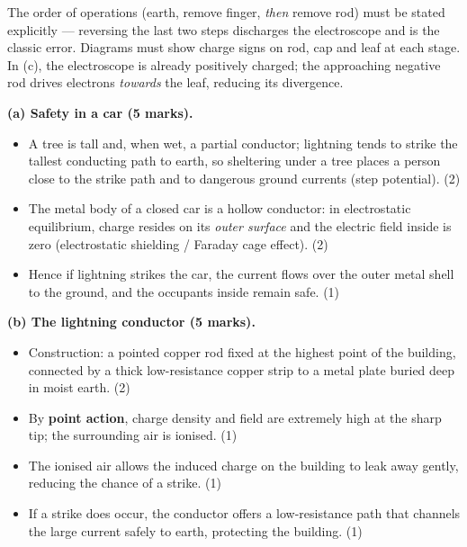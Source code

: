 \documentclass[11pt]{article}
\begin{document}
\begin{attention}
The order of operations (earth, remove finger, \emph{then} remove rod) must be stated explicitly — reversing the last two steps discharges the electroscope and is the classic error. Diagrams must show charge signs on rod, cap and leaf at each stage. In (c), the electroscope is already positively charged; the approaching negative rod drives electrons \emph{towards} the leaf, reducing its divergence.
\end{attention}

\begin{corrige}
\textbf{(a) Safety in a car (5 marks).}
\begin{itemize}
\item A tree is tall and, when wet, a partial conductor; lightning tends to strike the tallest conducting path to earth, so sheltering under a tree places a person close to the strike path and to dangerous ground currents (step potential). \hfill (2)
\item The metal body of a closed car is a hollow conductor: in electrostatic equilibrium, charge resides on its \emph{outer surface} and the electric field inside is zero (electrostatic shielding / Faraday cage effect). \hfill (2)
\item Hence if lightning strikes the car, the current flows over the outer metal shell to the ground, and the occupants inside remain safe. \hfill (1)
\end{itemize}
\textbf{(b) The lightning conductor (5 marks).}
\begin{itemize}
\item Construction: a pointed copper rod fixed at the highest point of the building, connected by a thick low-resistance copper strip to a metal plate buried deep in moist earth. \hfill (2)
\item By \textbf{point action}, charge density and field are extremely high at the sharp tip; the surrounding air is ionised. \hfill (1)
\item The ionised air allows the induced charge on the building to leak away gently, reducing the chance of a strike. \hfill (1)
\item If a strike does occur, the conductor offers a low-resistance path that channels the large current safely to earth, protecting the building. \hfill (1)
\end{itemize}
\end{corrige}
\end{document}

